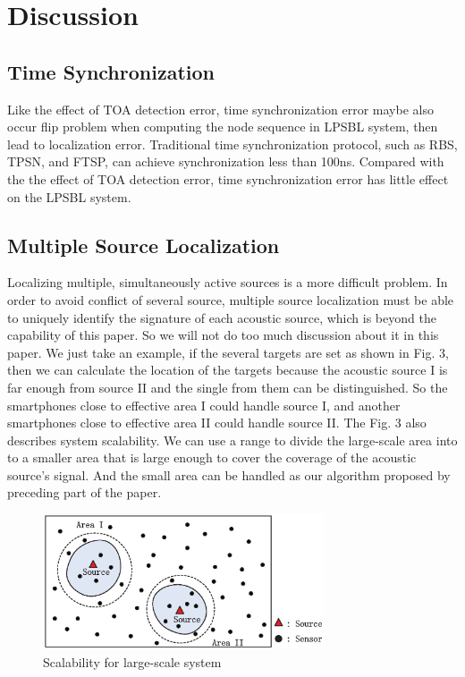 \section{Discussion}

\subsection{Time Synchronization }

Like the effect of TOA detection error, time synchronization error maybe also occur flip problem when computing the node sequence in LPSBL system, then lead to localization error.
Traditional time synchronization protocol, such as RBS, TPSN, and FTSP, can achieve synchronization less than 100ns. 
Compared with the the effect of TOA detection error, time synchronization error has little effect on the LPSBL system.

\subsection{Multiple Source Localization}

Localizing multiple, simultaneously active sources is a more difficult problem. 
In order to avoid conflict of several source, multiple source localization must be able to uniquely identify the signature of each acoustic source, which is beyond the capability of this paper. 
So we will not do too much discussion about it in this paper.
We just take an example, if the several targets are set as shown in Fig. 3, then we can calculate the location of the targets 
because the acoustic source I is far enough from source II and the single from them can be distinguished. 
So the smartphones close to effective area I could handle source I, and another smartphones close to effective area II could handle source II. 
The Fig. 3 also describes system scalability.
We can use a range to divide the large-scale area into to a smaller area that is large enough to cover the coverage of the acoustic source's signal.
And the small area can be handled as our algorithm proposed by preceding part of the paper.

  \begin{figure}[ht]
            \setlength{\abovecaptionskip}{0pt}
            \centering
            \includegraphics[scale=1.4,height=4.0cm]{image/fig3.eps}
             \vspace{1mm}
			\caption{Scalability for large-scale system}
			\label{Fig3}
            \label{multiple_source_localization}
            \vspace{-5mm}
  \end{figure}


